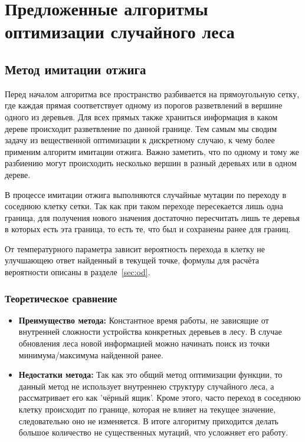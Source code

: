 \chapter{Предложенные алгоритмы оптимизации случайного леса}\label{chap:second}

\section{Метод имитации отжига}\label{sec:odod}

Перед началом алгоритма все пространство разбивается на прямоугольную сетку, где
каждая прямая соответствует одному из порогов разветвлений в вершине одного из
деревьев. Для всех прямых также храниться информация в каком дереве происходит
разветвление по данной границе. Тем самым мы сводим задачу из вещественной
оптимизации к дискретному случаю, к чему более применим алгоритм имитации
отжига. Важно заметить, что по одному и тому же разбиению могут происходить
несколько вершин в разный деревьях или в одном дереве.

В процессе имитации отжига выполняются случайные мутации по переходу в соседнюю
клетку сетки. Так как при таком переходе пересекается лишь одна граница, для
получения нового значения достаточно пересчитать лишь те деревья в которых есть
эта граница, то есть те, что был и сохранены ранее для границ.

От температурного параметра зависит вероятность перехода в клетку не улучшающею
ответ найденный в текущей точке, формулы для расчёта вероятности описаны
в разделе~\ref{sec:od}.

\subsection{Теоретическое сравнение}

\begin{itemize}
    \item \textbf{Преимущество метода:} Константное время работы, не
    зависящие от внутренней сложности устройства конкретных деревьев в лесу.
    В случае обновления леса новой информацией можно начинать поиск из точки
    минимума/максимума найденной ранее.
    \item \textbf{Недостатки метода:} Так как это общий метод оптимизации функции, то
    данный метод не использует внутреннею структуру случайного леса,
    а рассматривает его как 'чёрный ящик'. Кроме этого, часто переход в соседнюю
    клетку происходит по границе, которая не влияет на текущее значение,
    следовательно оно не изменяется. В итоге алгоритму приходится делать большое
    количество не существенных мутаций, что усложняет его работу.
\end{itemize}

